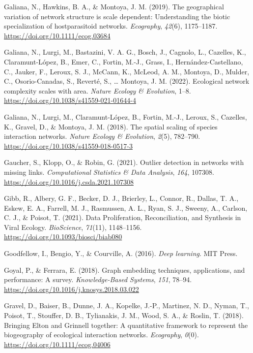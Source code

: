 \documentclass[10pt,oneside]{article}
\newlength{\cslhangindent}
\newenvironment{CSLReferences}[2] %
 {%
  \setlength{\parindent}{0pt}
  \ifodd #1 \everypar{\setlength{\hangindent}{\cslhangindent}}\ignorespaces\fi
  \ifnum #2 > 0
  \setlength{\parskip}{#2\baselineskip}
  \fi
 }%
 {}
\begin{document}
\begin{CSLReferences}{1}{0}
\leavevmode{}%
Galiana, N., Hawkins, B. A., \& Montoya, J. M. (2019). The geographical
variation of network structure is scale dependent: Understanding the
biotic specialization of hostparasitoid networks. \emph{Ecography},
\emph{42}(6), 1175--1187. \url{https://doi.org/10.1111/ecog.03684}

\leavevmode{}%
Galiana, N., Lurgi, M., Bastazini, V. A. G., Bosch, J., Cagnolo, L.,
Cazelles, K., Claramunt-López, B., Emer, C., Fortin, M.-J., Grass, I.,
Hernández-Castellano, C., Jauker, F., Leroux, S. J., McCann, K., McLeod,
A. M., Montoya, D., Mulder, C., Osorio-Canadas, S., Reverté, S.,
\ldots{} Montoya, J. M. (2022). Ecological network complexity scales
with area. \emph{Nature Ecology \& Evolution}, 1--8.
\url{https://doi.org/10.1038/s41559-021-01644-4}

\leavevmode{}%
Galiana, N., Lurgi, M., Claramunt-López, B., Fortin, M.-J., Leroux, S.,
Cazelles, K., Gravel, D., \& Montoya, J. M. (2018). The spatial scaling
of species interaction networks. \emph{Nature Ecology \& Evolution},
\emph{2}(5), 782--790. \url{https://doi.org/10.1038/s41559-018-0517-3}

\leavevmode{}%
Gaucher, S., Klopp, O., \& Robin, G. (2021). Outlier detection in
networks with missing links. \emph{Computational Statistics \& Data
Analysis}, \emph{164}, 107308.
\url{https://doi.org/10.1016/j.csda.2021.107308}

\leavevmode{}%
Gibb, R., Albery, G. F., Becker, D. J., Brierley, L., Connor, R.,
Dallas, T. A., Eskew, E. A., Farrell, M. J., Rasmussen, A. L., Ryan, S.
J., Sweeny, A., Carlson, C. J., \& Poisot, T. (2021). Data
Proliferation, Reconciliation, and Synthesis in Viral Ecology.
\emph{BioScience}, \emph{71}(11), 1148--1156.
\url{https://doi.org/10.1093/biosci/biab080}

\leavevmode{}%
Goodfellow, I., Bengio, Y., \& Courville, A. (2016). \emph{Deep
learning}. MIT Press.

\leavevmode{}%
Goyal, P., \& Ferrara, E. (2018). Graph embedding techniques,
applications, and performance: A survey. \emph{Knowledge-Based Systems},
\emph{151}, 78--94. \url{https://doi.org/10.1016/j.knosys.2018.03.022}

\leavevmode{}%
Gravel, D., Baiser, B., Dunne, J. A., Kopelke, J.-P., Martinez, N. D.,
Nyman, T., Poisot, T., Stouffer, D. B., Tylianakis, J. M., Wood, S. A.,
\& Roslin, T. (2018). Bringing Elton and Grinnell together: A
quantitative framework to represent the biogeography of ecological
interaction networks. \emph{Ecography}, \emph{0}(0).
\url{https://doi.org/10.1111/ecog.04006}


\end{CSLReferences}
\end{document}
